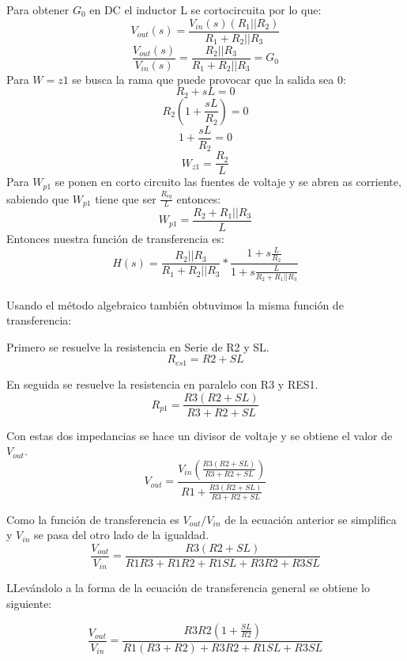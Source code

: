 \documentclass{report}
\newcounter{ns}
\begin{document}
	Para obtener $G_0$ en DC el inductor L se cortocircuita por lo que:
	\[V_{out}(s)=\frac{V_{in}(s)(R_1||R_2)}{R_1+R_2||R_3}\]
	\[\frac{V_{out}(s)}{V_{in}(s)}=\frac{R_2||R_3}{R_1+R_2||R_3}=G_0\]
	Para $W={z1}$ se busca la rama que puede provocar que la salida sea 0:
	\[R_2+sL=0\]
	\[R_2(1+\frac{sL}{R_2})=0\]
	\[1+\frac{sL}{R_2}=0\]
	\[W_{z1}=\frac{R_2}{L}\]
	Para $W_{p1}$ se ponen en corto circuito las fuentes de voltaje y se abren as corriente, sabiendo que $W_{p1}$ tiene que ser $\frac{R_{eq}}{L}$ entonces:
	\[W_{p1}=\frac{R_2+R_1||R_3}{L}\]
	Entonces nuestra función de transferencia es:
	\[H(s)=\frac{R_2||R_3}{R_1+R_2||R_3}*\frac{1+s\frac{L}{R_2}}{1+s\frac{L}{R_2+R_1||R_3}}\]\\
	
	Usando el método algebraico también obtuvimos la misma función de transferencia:
	
	Primero se resuelve la resistencia en Serie de R2 y SL.\\
	
	\begin{equation*}
	R_{es1} = R2 + SL
	\end{equation*}
	
	En seguida se resuelve la resistencia en paralelo con R3 y RES1.\\
	
	\begin{equation*}
	R_{p1} = \frac{R3(R2 + SL)}{R3 + R2 + SL}
	\end{equation*}
	
	Con estas dos impedancias se hace un divisor de voltaje y se obtiene el valor de $V_{out}$.\\
	
	\begin{equation*}
	V_{out}=\frac{V_{in}(\frac{R3(R2 + SL)}{R3 + R2 + SL})}{R1 + \frac{R3(R2 + SL)}{R3 + R2 + SL}}
	\end{equation*}
	
	Como la función de transferencia es $V_{out}/V_{in}$ de la ecuación anterior se simplifica y $V_{in}$ se pasa del otro lado de la igualdad.\\
	
	\begin{equation*}
	\frac{V_{out}}{V_{in}} = \frac{R3(R2 + SL)}{R1R3 + R1R2 + R1SL + R3R2 + R3SL}
	\end{equation*}
	
	LLevándolo a la forma de la ecuación de transferencia general se obtiene lo siguiente:
	
	\begin{equation*}
	\frac{V_{out}}{V_{in}} = \frac{R3R2(1 + \frac{SL}{R2})}{R1(R3 + R2) + R3R2 + R1SL + R3SL}
	\end{equation*}
	
\end{document}
